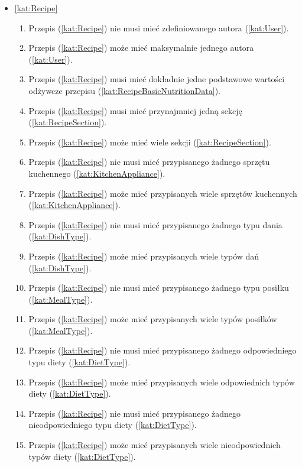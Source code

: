 \begin{itemize}[label={\textbf{Reguły dla}}, wide, labelwidth=!, labelindent=0pt]
    \setlength\itemsep{1.75em}
    \item\ref{kat:Recipe}\mynobreakpar
    \begin{enumerate}[label={\textbf{REG/3/\protect\twodigits{\arabic{enumi}}}}, wide, labelwidth=!, align=left, leftmargin=3cm]
        \item Przepis (\ref{kat:Recipe}) nie musi mieć zdefiniowanego autora (\ref{kat:User}).
        \item Przepis (\ref{kat:Recipe}) może mieć maksymalnie jednego autora (\ref{kat:User}).
        \item Przepis (\ref{kat:Recipe}) musi mieć dokładnie jedne podstawowe wartości odżywcze przepisu (\ref{kat:RecipeBasicNutritionData}).
        \item Przepis (\ref{kat:Recipe}) musi mieć przynajmniej jedną sekcję (\ref{kat:RecipeSection}).
        \item Przepis (\ref{kat:Recipe}) może mieć wiele sekcji (\ref{kat:RecipeSection}).
        \item Przepis (\ref{kat:Recipe}) nie musi mieć przypisanego żadnego sprzętu kuchennego (\ref{kat:KitchenAppliance}).
        \item Przepis (\ref{kat:Recipe}) może mieć przypisanych wiele sprzętów kuchennych (\ref{kat:KitchenAppliance}).
        \item Przepis (\ref{kat:Recipe}) nie musi mieć przypisanego żadnego typu dania (\ref{kat:DishType}).
        \item Przepis (\ref{kat:Recipe}) może mieć przypisanych wiele typów dań (\ref{kat:DishType}).
        \item Przepis (\ref{kat:Recipe}) nie musi mieć przypisanego żadnego typu posiłku (\ref{kat:MealType}).
        \item Przepis (\ref{kat:Recipe}) może mieć przypisanych wiele typów posiłków (\ref{kat:MealType}).
        \item Przepis (\ref{kat:Recipe}) nie musi mieć przypisanego żadnego odpowiedniego typu diety (\ref{kat:DietType}).
        \item Przepis (\ref{kat:Recipe}) może mieć przypisanych wiele odpowiednich typów diety  (\ref{kat:DietType}).
        \item Przepis (\ref{kat:Recipe}) nie musi mieć przypisanego żadnego nieodpowiedniego typu diety (\ref{kat:DietType}).
        \item Przepis (\ref{kat:Recipe}) może mieć przypisanych wiele nieodpowiednich typów diety (\ref{kat:DietType}).

\end{enumerate}
\end{itemize}

